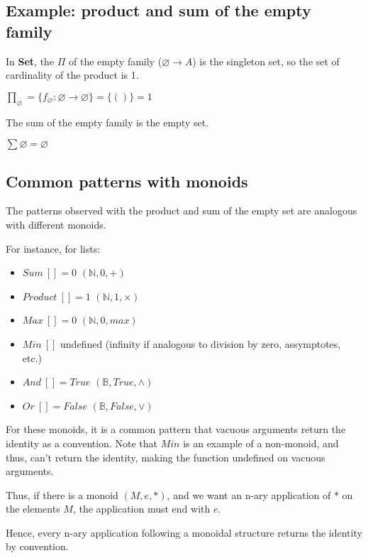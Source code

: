 \documentclass[../main.tex]{subfiles}
\begin{document}
\subsection{Example: product and sum of the empty family}

In \textbf{Set}, the $\Pi$ of the empty family ($ \varnothing \rightarrow A$) is the singleton set, so the set of cardinality of the product is 1.

$\prod_\varnothing = \{f_\varnothing : \varnothing \rightarrow \varnothing \} = \{()\} = 1$

The sum of the empty family is the empty set.

$\sum \varnothing = \varnothing$

\subsection{Common patterns with monoids}

The patterns observed with the product and sum of the empty set are analogous with different monoids.

For instance, for lists:
\begin{itemize}
\item $Sum ~[] = 0$     \quad $(\mathbb{N},0,+)$
\item $Product ~[] = 1$ \quad $(\mathbb{N},1,\times)$
\item $Max ~[] = 0$     \quad $(\mathbb{N},0,max)$
\item $Min ~[]$  \quad undefined (infinity if analogous to division by zero, assymptotes, etc.)
\item $And ~[] = True$  \quad $(\mathbb{B},True,\wedge)$
\item $Or ~[] = False$  \quad $(\mathbb{B},False,\vee)$
\end{itemize}

For these monoids, it is a common pattern that vacuous arguments return the identity as a convention. Note that $Min$ is an example of a non-monoid, and thus, can't return the identity, making the function undefined on vacuous arguments.

Thus, if there is a monoid $(M,e,*)$, and we want an n-ary application of $*$ on the elements $M$, the application must end with $e$.

Hence, every n-ary application following a monoidal structure returns the identity by convention.
\end{document}
